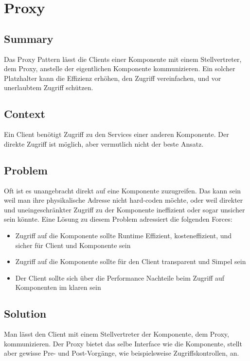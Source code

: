\chapter{Proxy}
\section{Summary}
Das Proxy Pattern lässt die Clients einer Komponente mit einem Stellvertreter, dem Proxy, anstelle der eigentlichen Komponente kommunizieren. Ein solcher Platzhalter kann die Effizienz erhöhen, den Zugriff vereinfachen, und vor unerlaubtem Zugriff schützen.
\section{Context}
Ein Client benötigt Zugriff zu den Services einer anderen Komponente. Der direkte Zugriff ist möglich, aber vermutlich nicht der beste Ansatz.
\section{Problem}
Oft ist es unangebracht direkt auf eine Komponente zuzugreifen. Das kann sein weil man ihre physikalische Adresse nicht hard-coden möchte, oder weil direkter und uneingeschränkter Zugriff zu der Komponente ineffizient oder sogar unsicher sein könnte. Eine Lösung zu diesem Problem adressiert die folgenden Forces:
\begin{itemize}
	\item Zugriff auf die Komponente sollte Runtime Effizient, kosteneffizient, und sicher für Client und Komponente sein
	\item Zugriff auf die Komponente sollte für den Client transparent und Simpel sein
	\item Der Client sollte sich über die Performance Nachteile beim Zugriff auf Komponenten im klaren sein
\end{itemize}
\section{Solution}
Man lässt den Client mit einem Stellvertreter der Komponente, dem Proxy, kommunizieren. Der Proxy bietet das selbe Interface wie die Komponente, stellt aber gewisse Pre- und Post-Vorgänge, wie beispielsweise Zugriffskontrollen, an.
